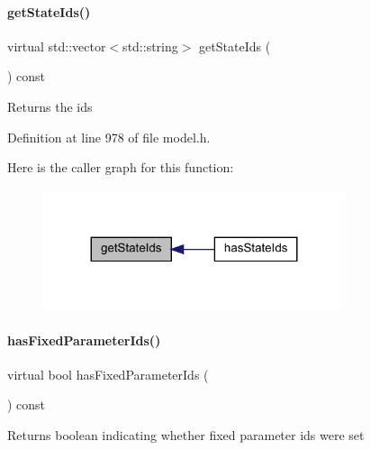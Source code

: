 \paragraph{\texorpdfstring{get\+State\+Ids()}{getStateIds()}}
{\footnotesize\ttfamily virtual std\+::vector$<$std\+::string$>$ get\+State\+Ids (\begin{DoxyParamCaption}{ }\end{DoxyParamCaption}) const\hspace{0.3cm}{\ttfamily [virtual]}}

\begin{DoxyReturn}{Returns}
the ids 
\end{DoxyReturn}


Definition at line 978 of file model.\+h.

Here is the caller graph for this function\+:
\nopagebreak
\begin{figure}[H]
\begin{center}
\leavevmode
\includegraphics[width=251pt]{classamici_1_1_model_a8a93b9fcddaaa762dacc654ffc379af1_icgraph}
\end{center}
\end{figure}
\mbox{\label{classamici_1_1_model_af6cb68d368b1288fa0d7515242bf7a5b}} 
\paragraph{\texorpdfstring{has\+Fixed\+Parameter\+Ids()}{hasFixedParameterIds()}}
{\footnotesize\ttfamily virtual bool has\+Fixed\+Parameter\+Ids (\begin{DoxyParamCaption}{ }\end{DoxyParamCaption}) const\hspace{0.3cm}{\ttfamily [virtual]}}

\begin{DoxyReturn}{Returns}
boolean indicating whether fixed parameter ids were set 
\end{DoxyReturn}


